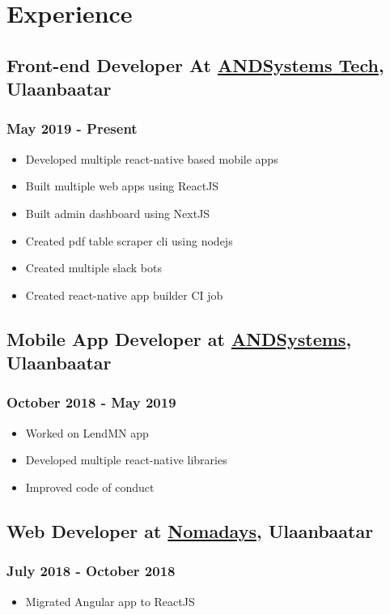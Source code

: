 \documentclass[letterpaper]{article}
\date{\today}
\title{}
\begin{document}

\section{Experience}
\label{sec:orga14b037}
\subsection{Front-end Developer At \href{https://andsystems.net}{ANDSystems Tech}, Ulaanbaatar}
\label{sec:org5a96fbb}
\subsubsection{May 2019 - Present}
\label{sec:org8693a7b}
\begin{itemize}
\item Developed multiple react-native based mobile apps
\item Built multiple web apps using ReactJS
\item Built admin dashboard using NextJS
\item Created pdf table scraper cli using nodejs
\item Created multiple slack bots
\item Created react-native app builder CI job
\end{itemize}
\subsection{Mobile App Developer at \href{https://andsystems.net}{ANDSystems}, Ulaanbaatar}
\label{sec:org591e8c5}
\subsubsection{October 2018 - May 2019}
\label{sec:org20bede2}
\begin{itemize}
\item Worked on LendMN app
\item Developed multiple react-native libraries
\item Improved code of conduct
\end{itemize}
\subsection{Web Developer at \href{https:nomadays.com}{Nomadays}, Ulaanbaatar}
\label{sec:orgcd75595}
\subsubsection{July 2018 - October 2018}
\label{sec:org2777972}
\begin{itemize}
\item Migrated Angular app to ReactJS
\end{itemize}
\end{document}
